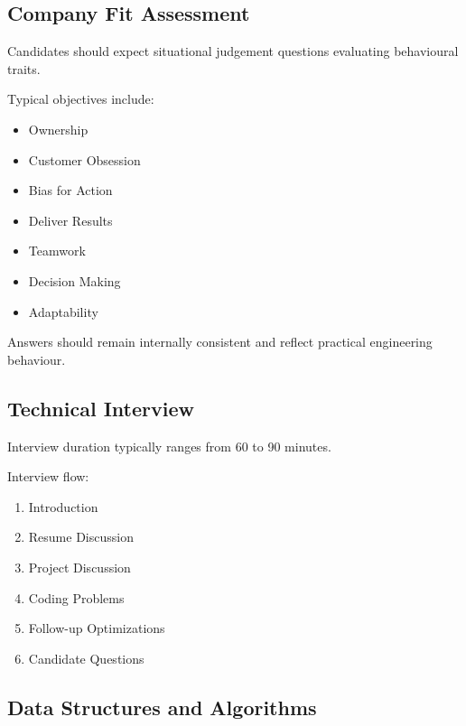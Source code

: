\documentclass[11pt,a4paper]{article}
\begin{document}

\subsection{Company Fit Assessment}

Candidates should expect situational judgement questions evaluating behavioural traits.

Typical objectives include:

\begin{itemize}
	\item Ownership
	\item Customer Obsession
	\item Bias for Action
	\item Deliver Results
	\item Teamwork
	\item Decision Making
	\item Adaptability
\end{itemize}

Answers should remain internally consistent and reflect practical engineering behaviour.


\subsection{Technical Interview}

Interview duration typically ranges from 60 to 90 minutes.

Interview flow:

\begin{enumerate}
	\item Introduction
	\item Resume Discussion
	\item Project Discussion
	\item Coding Problems
	\item Follow-up Optimizations
	\item Candidate Questions
\end{enumerate}


\subsection{Data Structures and Algorithms}
\end{document}
